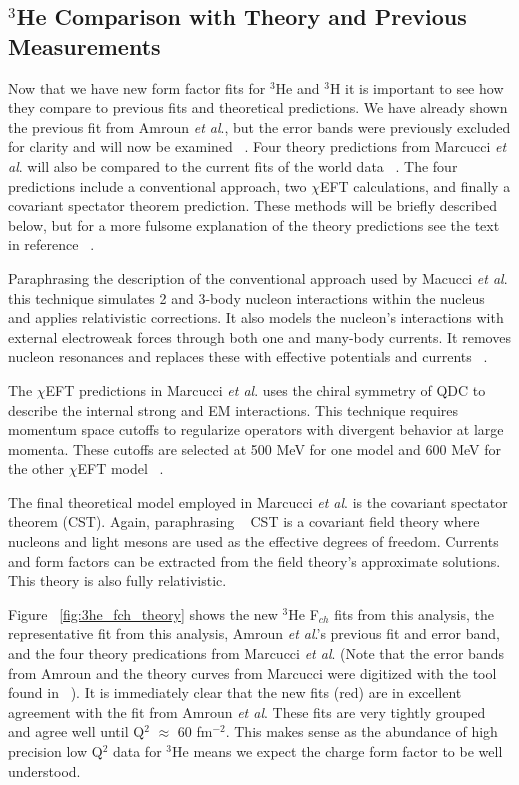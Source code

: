 \subsection{$^3$He Comparison with Theory and Previous Measurements}
\label{ssec:3he_comparison_with_theory}

Now that we have new form factor fits for $^3$He and $^3$H it is important to see how they compare to previous fits and theoretical predictions. We have already shown the previous fit from Amroun \textit{et al}., but the error bands were previously excluded for clarity and will now be examined ~\cite{Article:Amroun}. Four theory predictions from Marcucci \textit{et al}. will also be compared to the current fits of the world data ~\cite{Article:Marcucci}. The four predictions include a conventional approach, two $\chi$EFT calculations, and finally a covariant spectator theorem prediction. These methods will be briefly described below, but for a more fulsome explanation of the theory predictions see the text in reference ~\cite{Article:Marcucci}.

Paraphrasing the description of the conventional approach used by Macucci \textit{et al}. this technique simulates 2 and 3-body nucleon interactions within the nucleus and applies relativistic corrections. It also models the nucleon's interactions with external electroweak forces through both one and many-body currents. It removes nucleon resonances and replaces these with effective potentials and currents ~\cite{Article:Marcucci}.

The $\chi$EFT predictions in Marcucci \textit{et al}. uses the chiral symmetry of QDC to describe the internal strong and EM interactions. This technique requires momentum space cutoffs to regularize operators with divergent behavior at large momenta. These cutoffs are selected at 500 MeV for one model and 600 MeV for the other $\chi$EFT model ~\cite{Article:Marcucci}.

The final theoretical model employed in Marcucci \textit{et al}. is the covariant spectator theorem (CST). Again, paraphrasing ~\cite{Article:Marcucci} CST is a covariant field theory where nucleons and light mesons are used as the effective degrees of freedom. Currents and form factors can be extracted from the field theory's approximate solutions. This theory is also fully relativistic.

Figure ~\ref{fig:3he_fch_theory} shows the new $^3$He F$_{ch}$ fits from this analysis, the representative fit from this analysis, Amroun \textit{et al}.'s previous fit and error band, and the four theory predications from Marcucci \textit{et al}. (Note that the error bands from Amroun and the theory curves from Marcucci were digitized with the tool found in ~\cite{web_plot_digitizer}). It is immediately clear that the new fits (red) are in excellent agreement with the fit from Amroun \textit{et al}. These fits are very tightly grouped and agree well until Q$^2$ $\approx$ 60 fm$^{-2}$. This makes sense as the abundance of high precision low Q$^2$ data for $^3$He means we expect the charge form factor to be well understood. 


